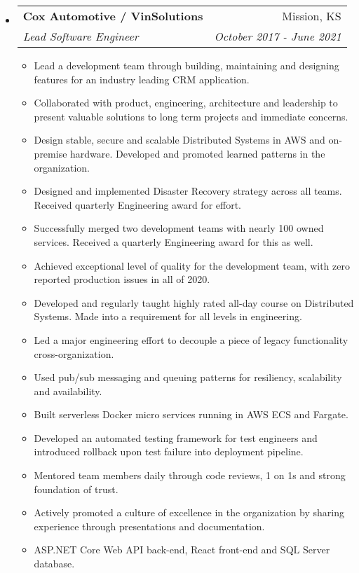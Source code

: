 \documentclass[letterpaper,11pt]{article}
\makeatletter
\newcommand{\resitem}[1]{\item #1 \vspace{0pt}}
\newcommand{\ressubheading}[4]{
\begin{tabular*}{6.5in}{l@{\cftdotfill{\cftsecdotsep}\extracolsep{\fill}}r}
		\textbf{#1} & #2 \\
		\textit{#3} & \textit{#4} \\
\end{tabular*}\vspace{-2pt}}
\makeatother
\begin{document}
\begin{itemize}
\item 
  \ressubheading{Cox Automotive / VinSolutions}{Mission, KS}{Lead Software Engineer}{October 2017 - June 2021}
    \begin{itemize}
        \resitem {
            Lead a development team through building, maintaining and designing features for an industry leading CRM application.
        }
        \resitem{
            Collaborated with product, engineering, architecture and leadership to present valuable solutions to long term projects and immediate concerns.
        }
        \resitem{
            Design stable, secure and scalable Distributed Systems in AWS and on-premise hardware. Developed and promoted learned patterns in the organization.
        }
        \resitem{
            Designed and implemented Disaster Recovery strategy across all teams. Received quarterly Engineering award for effort.
        }
        \resitem{
            Successfully merged two development teams with nearly 100 owned services. Received a quarterly Engineering award for this as well.
        }
        \resitem{
            Achieved exceptional level of quality for the development team, with zero reported production issues in all of 2020.
        }
        \resitem{
            Developed and regularly taught highly rated all-day course on Distributed Systems. Made into a requirement for all levels in engineering.
        }
        \resitem{
            Led a major engineering effort to decouple a piece of legacy functionality cross-organization.
        }
        \resitem{
            Used pub/sub messaging and queuing patterns for resiliency, scalability and availability.
        }
        \resitem{
            Built serverless Docker micro services running in AWS ECS and Fargate.
        }
        \resitem{
            Developed an automated testing framework for test engineers and introduced rollback upon test failure into deployment pipeline.
        }
        \resitem{
            Mentored team members daily through code reviews, 1 on 1s and strong foundation of trust.
        }
        \resitem{
            Actively promoted a culture of excellence in the organization by sharing experience through presentations and documentation.
        }
        \resitem{
            ASP.NET Core Web API back-end, React front-end and SQL Server database.
        }
	\end{itemize}


\end{itemize}
\end{document}
